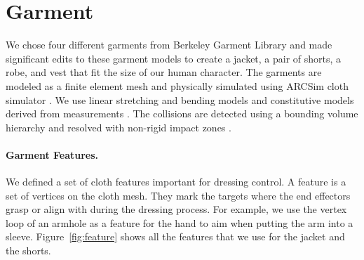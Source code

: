 \section{Garment}

We chose four different garments from Berkeley Garment Library and made significant edits to these garment models to create a jacket, a pair of shorts, a robe, and vest that fit the size of our human character. The garments are modeled as a finite element mesh and physically simulated using ARCSim cloth simulator \cite{Narain:2012:AAR}. We use linear stretching and bending models and constitutive models derived from measurements \cite{Wang:2011}. The collisions are detected using a bounding volume hierarchy \cite{Tang:2010} and resolved with non-rigid impact zones \cite{Harmon:2008}.

\paragraph{Garment Features.} We defined a set of cloth features important for dressing control. A feature is a set of vertices on the cloth mesh. They mark the targets where the end effectors grasp or align with during the dressing process. For example, we use the vertex loop of an armhole as a feature for the hand to aim when putting the arm into a sleeve. Figure~\ref{fig:feature} shows all the features that we use for the jacket and the shorts.
